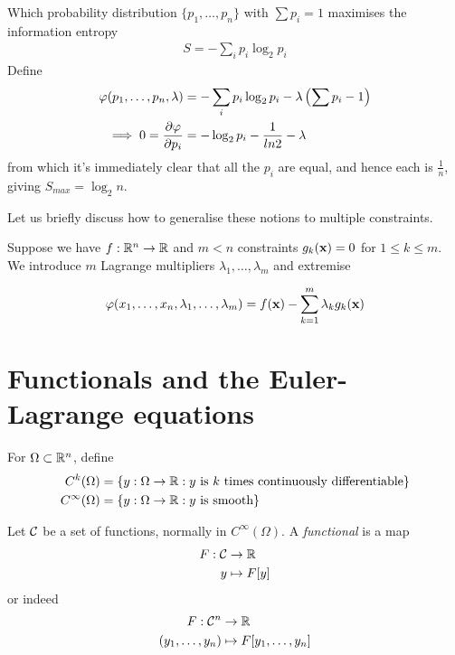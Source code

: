 \documentclass{../template/note}
\begin{document}
    \begin{example*}
        Which probability distribution $\{p_1, \dots, p_n\}$ with $\sum p_i = 1$ maximises the information entropy
        \begin{align*}
            S = -\sum_i p_i \log_2 p_i
        \end{align*}
        Define
        \begin{align*}
            \varphi(p_1, \dots, p_n, \lambda) &= -\sum_i p_i \log_2 p_i - \lambda\left(\sum p_i -1\right) \\
            \implies 0 = \pd{\varphi}{p_i} &= -\log_2 p_i - \frac 1 {ln 2} - \lambda
        \end{align*}
        from which it's immediately clear that all the $p_i$ are equal, and hence each is $\frac 1 n$, giving $S_{max} = \log_2 n$.        
    \end{example*}
    
    Let us briefly discuss how to generalise these notions to multiple constraints.

    Suppose we have $f: \mathbb R^n \to \mathbb R$ and $m < n$ constraints $g_k(\V x) = 0$ for $1 \leq k \leq m$. We introduce $m$ Lagrange multipliers $\lambda_1, \dots, \lambda_m$ and extremise

    \begin{align*}
        \varphi(x_1, \dots, x_n, \lambda_1, \dots, \lambda_m) = f(\V x) - \sum_{k=1}^m \lambda_k g_k(\V x)
    \end{align*}
    
    \section{Functionals and the Euler-Lagrange equations}

    \begin{definition}
        For $\Omega \subset \mathbb R^n$, define
        \begin{align*}
            C^k(\Omega) &= \{y: \Omega \to \mathbb R: y \text{ is } k \text{ times continuously differentiable}\} \\
            C^\infty(\Omega) &= \{y: \Omega \to \mathbb R: y \text{ is smooth}\}
        \end{align*}      
    \end{definition}
    
    \begin{definition}[Functionals]
        Let $\mathcal{C}$ be a set of functions, normally in $C^\infty(\Omega)$. A \emph{functional} is a map
        \begin{align*}
            F: \mathcal{C} &\to \mathbb R \\
            y &\mapsto F[y]
        \end{align*}
        or indeed
        \begin{align*}
            F: \mathcal{C}^n &\to \mathbb R \\
            (y_1, \dots, y_n) &\mapsto F[y_1, \dots, y_n]
        \end{align*}       
    \end{definition}
    
\end{document}
